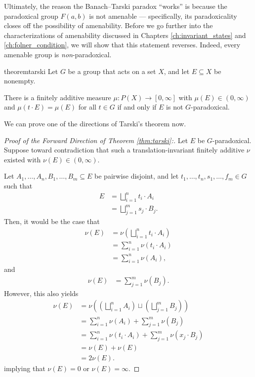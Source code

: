 Ultimately, the reason the Banach--Tarski paradox ``works'' is because the paradoxical group $F(a,b)$ is not amenable --- specifically, its paradoxicality closes off the possibility of amenability. Before we go further into the characterizations of amenability discussed in Chapters \ref{ch:invariant_states} and \ref{ch:folner_condition}, we will show that this statement reverses. Indeed, every amenable group is \textit{non}-paradoxical.
\begin{restatable}{theorem}{tarski}
  Let $G$ be a group that acts on a set $X$, and let $E \subseteq X$ be nonempty.\newline

  There is a finitely additive measure $\mu \colon P(X) \to [0, \infty]$ with $\mu(E) \in (0, \infty)$ and $\mu\left( t\cdot E \right) = \mu(E)$ for all $t\in G$ if and only if $E$ is not $G$-paradoxical.
\label{thm:tarski}
\end{restatable}
We can prove one of the directions of Tarski's theorem now.
\begin{proof}[Proof of the Forward Direction of Theorem \ref{thm:tarski}:]
  Let $E$ be $G$-paradoxical. Suppose toward contradiction that such a translation-invariant finitely additive $\nu$ existed with $\nu(E) \in (0,\infty)$.\newline

  Let $A_1,\dots,A_n,B_1,\dots,B_m\subseteq E$ be pairwise disjoint, and let $t_1,\dots,t_n,s_1,\dots,f_m\in G$ such that
  \begin{align*}
    E &= \bigsqcup_{i=1}^{n}t_i\cdot A_i\\
      &= \bigsqcup_{j=1}^{m}s_j\cdot B_j.
  \end{align*}
  Then, it would be the case that
  \begin{align*}
    \nu(E) &= \nu\left(\bigsqcup_{i=1}^{n}t_i\cdot A_i\right)\\
           &= \sum_{i=1}^{n}\nu\left(t_i\cdot A_i\right)\\
           &= \sum_{i=1}^{n}\nu\left(A_i\right),
  \end{align*}
  and
  \begin{align*}
    \nu(E) &= \sum_{j=1}^{m}\nu\left(B_j\right).
  \end{align*}
  However, this also yields
  \begin{align*}
    \nu\left(E\right) &= \nu\left(\left(\bigsqcup_{i=1}^{n}A_i\right)\sqcup \left(\bigsqcup_{j=1}^{m}B_j\right)\right)\\
                      &= \sum_{i=1}^{n}\nu\left(A_i\right) + \sum_{j=1}^{m}\nu\left(B_j\right)\\
                      &= \sum_{i=1}^{n}\nu\left(t_i\cdot A_i\right) + \sum_{j=1}^{m}\nu\left(x_j\cdot B_j\right)\\
                      &= \nu\left(E\right) + \nu\left(E\right)\\
                      &= 2\nu\left(E\right).
  \end{align*}
  implying that $\nu(E) = 0$ or $\nu(E) = \infty$.
\end{proof}
